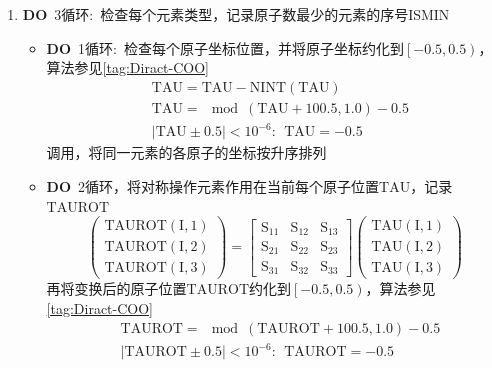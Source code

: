 \documentclass{article}      %
\begin{document}
\begin{enumerate}
	\item \textbf{DO}~3循环:~检查每个元素类型，记录原子数最少的元素的序号\textrm{ISMIN}
		\begin{itemize}
			\item \textbf{DO}~1循环:~检查每个原子坐标位置，并将原子坐标约化到$\left[-0.5,0.5\right)$，算法参见\ref{tag:Diract-COO}
			\begin{displaymath}
				\begin{aligned}
					&\mathrm{TAU}=\mathrm{TAU}-\mathrm{NINT(TAU)}\\
					&\mathrm{TAU}=\mod(\mathrm{TAU}+100.5,1.0)-0.5\\
					&|\mathrm{TAU}\pm0.5|<10^{-6}:~~ \mathrm{TAU}=-0.5
				\end{aligned}
			\end{displaymath}
			调用，将同一元素的各原子的坐标按升序排列
		\item	\textbf{DO}~2循环，将对称操作元素作用在当前每个原子位置$\mathrm{TAU}$，记录$\mathrm{TAUROT}$
			\begin{displaymath}
				\begin{pmatrix}
					\mathrm{TAUROT(I,1)}\\\mathrm{TAUROT(I,2)}\\\mathrm{TAUROT(I,3)}
				\end{pmatrix}=
				\begin{bmatrix}
					\mathrm{S_{11}} &\mathrm{S_{12}} &\mathrm{S_{13}} \\
					\mathrm{S_{21}} &\mathrm{S_{22}} &\mathrm{S_{23}} \\
					\mathrm{S_{31}} &\mathrm{S_{32}} &\mathrm{S_{33}} 
				\end{bmatrix}
				\begin{pmatrix}
					\mathrm{TAU(I,1)}\\\mathrm{TAU(I,2)}\\\mathrm{TAU(I,3)}
				\end{pmatrix}
			\end{displaymath}
			再将变换后的原子位置$\mathrm{TAUROT}$约化到$\left[-0.5,0.5\right)$，算法参见\ref{tag:Diract-COO}
			\begin{displaymath}
				\begin{aligned}
					&\mathrm{TAUROT}=\mod(\mathrm{TAUROT}+100.5,1.0)-0.5\\
					&|\mathrm{TAUROT}\pm0.5|<10^{-6}:~~ \mathrm{TAUROT}=-0.5
				\end{aligned}
			\end{displaymath}

\end{itemize}
\end{enumerate}
\end{document}
